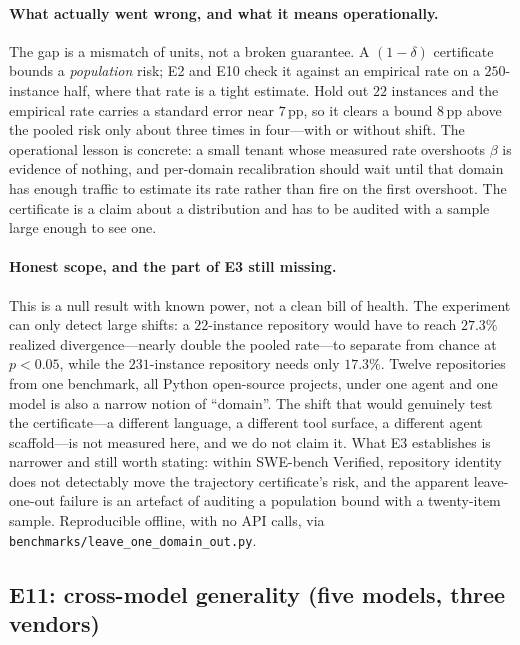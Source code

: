 \documentclass[11pt]{article}
\begin{document}
\paragraph{What actually went wrong, and what it means operationally.} The gap is a
mismatch of units, not a broken guarantee. A $(1{-}\delta)$ certificate bounds a
\emph{population} risk; E2 and E10 check it against an empirical rate on a $250$-instance
half, where that rate is a tight estimate. Hold out $22$ instances and the empirical rate
carries a standard error near $7$\,pp, so it clears a bound $8$\,pp above the pooled risk
only about three times in four---with or without shift. The operational lesson is concrete:
a small tenant whose measured rate overshoots $\beta$ is evidence of nothing, and
per-domain recalibration should wait until that domain has enough traffic to estimate its
rate rather than fire on the first overshoot. The certificate is a claim about a
distribution and has to be audited with a sample large enough to see one.

\paragraph{Honest scope, and the part of E3 still missing.} This is a null result with
known power, not a clean bill of health. The experiment can only detect large shifts: a
$22$-instance repository would have to reach $27.3\%$ realized divergence---nearly double
the pooled rate---to separate from chance at $p<0.05$, while the $231$-instance repository
needs only $17.3\%$. Twelve repositories from one benchmark, all Python open-source
projects, under one agent and one model is also a narrow notion of ``domain''. The shift
that would genuinely test the certificate---a different language, a different tool surface,
a different agent scaffold---is not measured here, and we do not claim it. What E3
establishes is narrower and still worth stating: within SWE-bench Verified, repository
identity does not detectably move the trajectory certificate's risk, and the apparent
leave-one-out failure is an artefact of auditing a population bound with a twenty-item
sample. Reproducible offline, with no API calls, via
\texttt{benchmarks/leave\_one\_domain\_out.py}.

\subsection{E11: cross-model generality (five models, three vendors)}
\label{sec:e11}
\end{document}
